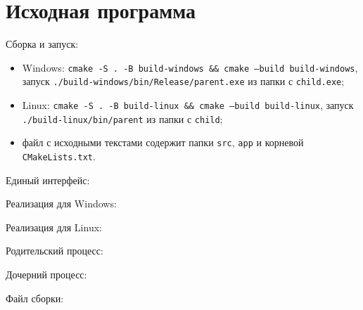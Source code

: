 \section{Исходная программа}

Сборка и запуск:
\begin{itemize}
  \item Windows: \texttt{cmake -S . -B build-windows \&\& cmake --build build-windows}, запуск
    \texttt{./build-windows/bin/Release/parent.exe} из папки с \texttt{child.exe};
  \item Linux: \texttt{cmake -S . -B build-linux \&\& cmake --build build-linux}, запуск
    \texttt{./build-linux/bin/parent} из папки с \texttt{child};
  \item файл с исходными текстами содержит папки \texttt{src}, \texttt{app} и корневой
    \texttt{CMakeLists.txt}.
\end{itemize}

Единый интерфейс:

\begin{center}

\end{center}

Реализация для Windows:

\begin{center}

\end{center}

Реализация для Linux:

\begin{center}

\end{center}

Родительский процесс:

\begin{center}

\end{center}

Дочерний процесс:

\begin{center}

\end{center}

Файл сборки:

\begin{center}

\end{center}

